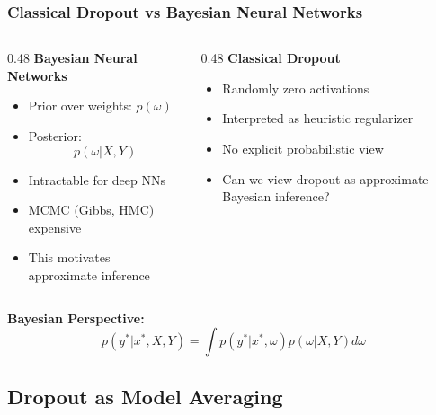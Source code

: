 \documentclass[
	11pt, %
]{beamer}
\begin{document}
\begin{frame}
	\frametitle{Classical Dropout vs Bayesian Neural Networks}

	\begin{columns}[t]
		\begin{column}{0.48\textwidth}
			\textbf{Bayesian Neural Networks}
			\begin{itemize}
				\item Prior over weights: $p(\omega)$
				\item Posterior:
				\[
				p(\omega|X,Y)
				\]
				\item Intractable for deep NNs
				\item MCMC (Gibbs, HMC) expensive
				\item This motivates \alert{approximate inference}
			\end{itemize}
		\end{column}

		\begin{column}{0.48\textwidth}
			\textbf{Classical Dropout}
			\begin{itemize}
				\item Randomly zero activations
				\item Interpreted as heuristic regularizer
				\item No explicit probabilistic view
				\item Can we view \alert{dropout} as approximate \alert{Bayesian} inference?
			\end{itemize}
		\end{column}
	\end{columns}
		\bigskip
	
	\textbf{Bayesian Perspective:}
	\[
	p(y^*|x^*,X,Y)
	=
	\int p(y^*|x^*,\omega)p(\omega|X,Y)d\omega
	\]
\end{frame}

\subsection{Dropout as Model Averaging}
\end{document}
